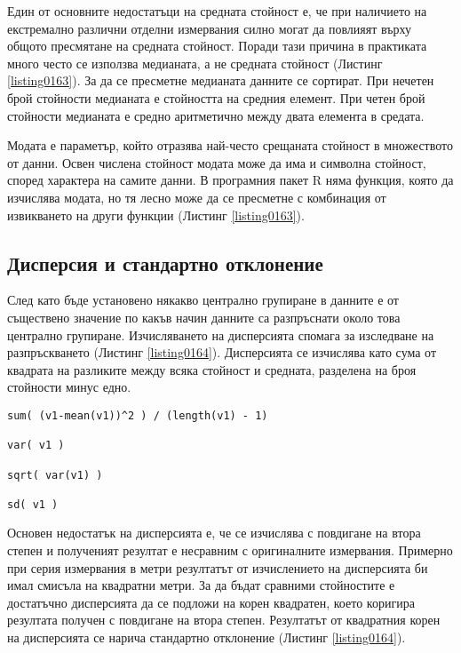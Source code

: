 Един от основните недостатъци на средната стойност е, че при наличието на екстремално различни отделни измервания силно могат да повлияят върху общото пресмятане на средната стойност. Поради тази причина в практиката много често се използва медианата, а не средната стойност (Листинг \ref{listing0163}). За да се пресметне медианата данните се сортират. При нечетен брой стойности медианата е стойността на средния елемент. При четен брой стойности медианата е средно аритметично между двата елемента в средата. 

Модата е параметър, който отразява най-често срещаната стойност в множеството от данни. Освен числена стойност модата може да има и символна стойност, според характера на самите данни. В програмния пакет R няма функция, която да изчислява модата, но тя лесно може да се пресметне с комбинация от извикването на други функции (Листинг \ref{listing0163}).

\subsection{Дисперсия и стандартно отклонение}

След като бъде установено някакво централно групиране в данните е от съществено значение по какъв начин данните са разпръснати около това централно групиране. Изчисляването на дисперсията спомага за изследване на разпръскването (Листинг \ref{listing0164}). Дисперсията се изчислява като сума от квадрата на разликите между всяка стойност и средната, разделена на броя стойности минус едно. 

\begin{lstlisting}[caption=Дисперсия и стандартно отклонение, label=listing0164]
sum( (v1-mean(v1))^2 ) / (length(v1) - 1)

var( v1 )

sqrt( var(v1) )

sd( v1 )
\end{lstlisting}

Основен недостатък на дисперсията е, че се изчислява с повдигане на втора степен и полученият резултат е несравним с оригиналните измервания. Примерно при серия измервания в метри резултатът от изчислението на дисперсията би имал смисъла на квадратни метри. За да бъдат сравними стойностите е достатъчно дисперсията да се подложи на корен квадратен, което коригира резултата получен с повдигане на втора степен. Резултатът от квадратния корен на дисперсията се нарича стандартно отклонение (Листинг \ref{listing0164}).

